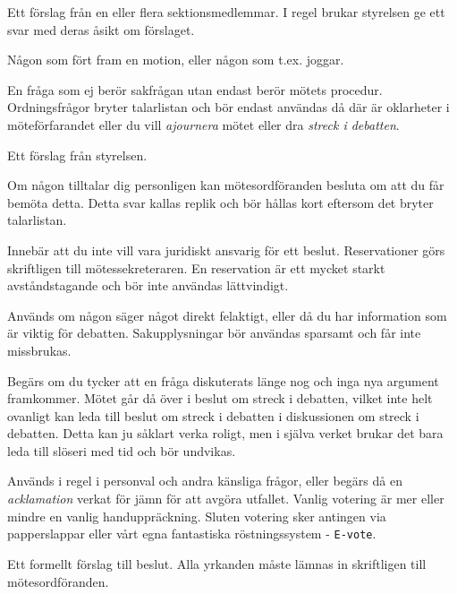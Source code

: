 \documentclass[../_main/handlingar.tex]{subfiles}
\begin{document}
\begin{description}[style=multiline, leftmargin=45mm]
    \item[Motion]
    Ett förslag från en eller flera sektionsmedlemmar. I regel brukar styrelsen ge ett svar med deras åsikt om förslaget.
    \item[Motionär] Någon som fört fram en motion, eller någon som t.ex. joggar.
    \item[Ordningsfråga]
    En fråga som ej berör sakfrågan utan endast berör mötets procedur. Ordningsfrågor bryter talarlistan och bör endast användas då där är oklarheter i möteförfarandet eller du vill \emph{ajournera} mötet eller dra \emph{streck i debatten}.
    \item[Proposition]
    Ett förslag från styrelsen.
    \item[Replik]
    Om någon tilltalar dig personligen kan mötesordföranden besluta om att du får bemöta detta. Detta svar kallas replik och bör hållas kort eftersom det bryter talarlistan.
    \item[Reservation]
    Innebär att du inte vill vara juridiskt ansvarig för ett beslut. Reservationer görs skriftligen till mötessekreteraren. En reservation är ett mycket starkt avståndstagande och bör inte användas lättvindigt.
    \item[Sakupplysning]
    Används om någon säger något direkt felaktigt, eller då du har information som är viktig för debatten. Sakupplysningar bör användas sparsamt och får inte missbrukas.
    \item[Streck i debatten]
    Begärs om du tycker att en fråga diskuterats länge nog och inga nya argument framkommer. Mötet går då över i beslut om streck i debatten, vilket inte helt ovanligt kan leda till beslut om streck i debatten i diskussionen om streck i debatten. Detta kan ju såklart verka roligt, men i själva verket brukar det bara leda till slöseri med tid och bör undvikas.
    \item[Votering]
    Används i regel i personval och andra känsliga frågor, eller begärs då en \emph{acklamation} verkat för jämn för att avgöra utfallet. Vanlig votering är mer eller mindre en vanlig handuppräckning. Sluten votering sker antingen via papperslappar eller vårt egna fantastiska röstningssystem - \texttt{E-vote}.
    \item[Yrkande]
    Ett formellt förslag till beslut. Alla yrkanden måste lämnas in skriftligen till mötesordföranden.
\end{description}
\end{document}
